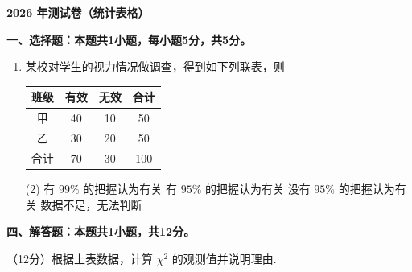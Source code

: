 \documentclass[12pt, a4paper, oneside]{ctexart}
\begin{document}
\begin{center}
    \LARGE{\textbf{2026 年测试卷（统计表格）}}
\end{center}

\vspace{0.5em}

\noindent\textbf{一、选择题：本题共1小题，每小题5分，共5分。}

\begin{enumerate}[itemsep=0.3em]
    \item 某校对学生的视力情况做调查，得到如下列联表，则

    \begin{center}
    \small
    \begin{tabular}{cccc}
    \toprule
    班级 & 有效 & 无效 & 合计 \\
    \midrule
    甲 & 40 & 10 & 50 \\
    乙 & 30 & 20 & 50 \\
    \midrule
    合计 & 70 & 30 & 100 \\
    \bottomrule
    \end{tabular}
    \end{center}

    \begin{tasks}(2)
        \task 有 $99\%$ 的把握认为有关
        \task 有 $95\%$ 的把握认为有关
        \task 没有 $95\%$ 的把握认为有关
        \task 数据不足，无法判断
    \end{tasks}
\end{enumerate}

\noindent\textbf{四、解答题：本题共1小题，共12分。}

\begin{examenum}[start=2, itemsep=1.5cm]
    \item （12分）根据上表数据，计算 $\chi^{2}$ 的观测值并说明理由.
\end{examenum}
\end{document}
